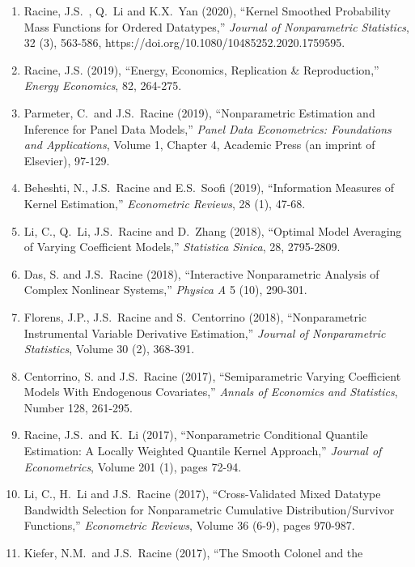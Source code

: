 \documentclass[
]{article}
\begin{document}
\begin{enumerate}
  Ma, S., J.S.~Racine and A.~Ullah (2020), ``Nonparametric Estimation of
  Marginal Effects in Regression-Spline Random Effects Models,''
  \emph{Econometric Reviews}, 39 (8), 792-825,
  https://doi.org/10.1080/07474938.2020.1772569.
\item
  Racine, J.S.~, Q.~Li and K.X.~Yan (2020), ``Kernel Smoothed
  Probability Mass Functions for Ordered Datatypes,'' \emph{Journal of
  Nonparametric Statistics}, 32 (3), 563-586,
  https://doi.org/10.1080/10485252.2020.1759595.
\item
  Racine, J.S. (2019), ``Energy, Economics, Replication \&
  Reproduction,'' \emph{Energy Economics}, 82, 264-275.
\item
  Parmeter, C.~and J.S.~Racine (2019), ``Nonparametric Estimation and
  Inference for Panel Data Models,'' \emph{Panel Data Econometrics:
  Foundations and Applications}, Volume 1, Chapter 4, Academic Press (an
  imprint of Elsevier), 97-129.
\item
  Beheshti, N., J.S.~Racine and E.S.~Soofi (2019), ``Information
  Measures of Kernel Estimation,'' \emph{Econometric Reviews}, 28 (1),
  47-68.
\item
  Li, C., Q.~Li, J.S.~Racine and D.~Zhang (2018), ``Optimal Model
  Averaging of Varying Coefficient Models,'' \emph{Statistica Sinica},
  28, 2795-2809.
\item
  Das, S. and J.S.~Racine (2018), ``Interactive Nonparametric Analysis
  of Complex Nonlinear Systems,'' \emph{Physica A} 5 (10), 290-301.
\item
  Florens, J.P., J.S.~Racine and S.~Centorrino (2018), ``Nonparametric
  Instrumental Variable Derivative Estimation,'' \emph{Journal of
  Nonparametric Statistics}, Volume 30 (2), 368-391.
\item
  Centorrino, S. and J.S.~Racine (2017), ``Semiparametric Varying
  Coefficient Models With Endogenous Covariates,'' \emph{Annals of
  Economics and Statistics}, Number 128, 261-295.
\item
  Racine, J.S.~and K.~Li (2017), ``Nonparametric Conditional Quantile
  Estimation: A Locally Weighted Quantile Kernel Approach,''
  \emph{Journal of Econometrics}, Volume 201 (1), pages 72-94.
\item
  Li, C., H.~Li and J.S.~Racine (2017), ``Cross-Validated Mixed Datatype
  Bandwidth Selection for Nonparametric Cumulative Distribution/Survivor
  Functions,'' \emph{Econometric Reviews}, Volume 36 (6-9), pages
  970-987.
\item
  Kiefer, N.M.~and J.S.~Racine (2017), ``The Smooth Colonel and the

\end{enumerate}
\end{document}
